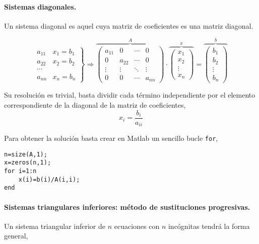 \paragraph{Sistemas diagonales.} Un sistema diagonal es aquel cuya matriz de coeficientes es una matriz diagonal. 

\begin{equation*}
\left. \begin{aligned}
a_{11}&x_1=b_1\\
a_{22}&x_2=b_2\\
\cdots & \\
a_{nn}&x_n=b_n
\end{aligned}\right\} \Rightarrow	\overbrace{\begin{pmatrix}
a_{11}& 0& \cdots & 0\\
0& a_{22}& \cdots & 0\\
\vdots & \vdots & \ddots & \vdots\\
0& 0& \cdots & a_{nn}
\end{pmatrix}}^A \cdot \overbrace{\begin{pmatrix}
x_1\\
x_2\\
\vdots \\
x_n
\end{pmatrix}}^x=\overbrace{\begin{pmatrix}
b_1\\
b_2\\
\vdots \\
b_n
\end{pmatrix}}^b
\end{equation*}

Su resolución es trivial, basta dividir cada término independiente por el elemento correspondiente de la diagonal de la matriz de coeficientes,
\begin{equation*}
x_i=\frac{b_i}{a_{ii}}
\end{equation*}

Para obtener la solución basta crear en Matlab un sencillo bucle \texttt{for},
\begin{verbatim}
n=size(A,1);
x=zeros(n,1);
for i=1:n
    x(i)=b(i)/A(i,i);
end
\end{verbatim} 

\paragraph{Sistemas triangulares inferiores: método de sustituciones progresivas.} Un sistema triangular inferior de $n$ ecuaciones con $n$ incógnitas tendrá la forma general,

